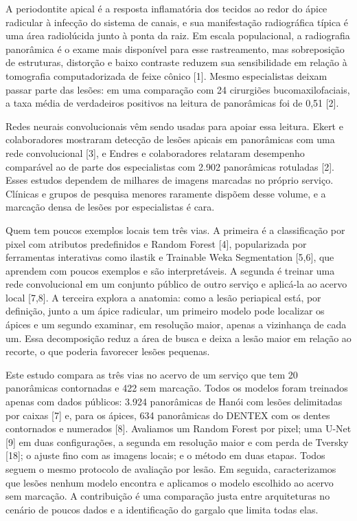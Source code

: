\documentclass[twocolumn]{article}
\begin{document}
A periodontite apical é a resposta inflamatória dos tecidos ao redor do ápice radicular à infecção do sistema de canais, e sua manifestação radiográfica típica é uma área radiolúcida junto à ponta da raiz. Em escala populacional, a radiografia panorâmica é o exame mais disponível para esse rastreamento, mas sobreposição de estruturas, distorção e baixo contraste reduzem sua sensibilidade em relação à tomografia computadorizada de feixe cônico [1]. Mesmo especialistas deixam passar parte das lesões: em uma comparação com 24 cirurgiões bucomaxilofaciais, a taxa média de verdadeiros positivos na leitura de panorâmicas foi de 0,51 [2].

Redes neurais convolucionais vêm sendo usadas para apoiar essa leitura. Ekert e colaboradores mostraram detecção de lesões apicais em panorâmicas com uma rede convolucional [3], e Endres e colaboradores relataram desempenho comparável ao de parte dos especialistas com 2.902 panorâmicas rotuladas [2]. Esses estudos dependem de milhares de imagens marcadas no próprio serviço. Clínicas e grupos de pesquisa menores raramente dispõem desse volume, e a marcação densa de lesões por especialistas é cara.

Quem tem poucos exemplos locais tem três vias. A primeira é a classificação por pixel com atributos predefinidos e Random Forest [4], popularizada por ferramentas interativas como ilastik e Trainable Weka Segmentation [5,6], que aprendem com poucos exemplos e são interpretáveis. A segunda é treinar uma rede convolucional em um conjunto público de outro serviço e aplicá-la ao acervo local [7,8]. A terceira explora a anatomia: como a lesão periapical está, por definição, junto a um ápice radicular, um primeiro modelo pode localizar os ápices e um segundo examinar, em resolução maior, apenas a vizinhança de cada um. Essa decomposição reduz a área de busca e deixa a lesão maior em relação ao recorte, o que poderia favorecer lesões pequenas.

Este estudo compara as três vias no acervo de um serviço que tem 20 panorâmicas contornadas e 422 sem marcação. Todos os modelos foram treinados apenas com dados públicos: 3.924 panorâmicas de Hanói com lesões delimitadas por caixas [7] e, para os ápices, 634 panorâmicas do DENTEX com os dentes contornados e numerados [8]. Avaliamos um Random Forest por pixel; uma U-Net [9] em duas configurações, a segunda em resolução maior e com perda de Tversky [18]; o ajuste fino com as imagens locais; e o método em duas etapas. Todos seguem o mesmo protocolo de avaliação por lesão. Em seguida, caracterizamos que lesões nenhum modelo encontra e aplicamos o modelo escolhido ao acervo sem marcação. A contribuição é uma comparação justa entre arquiteturas no cenário de poucos dados e a identificação do gargalo que limita todas elas.
\end{document}
